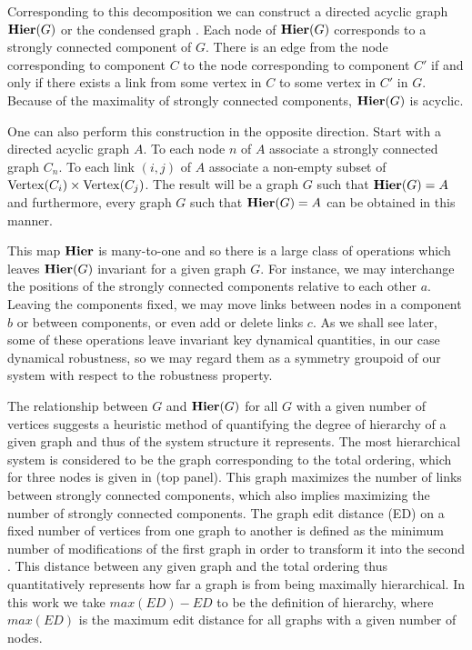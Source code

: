 Corresponding to this decomposition we can construct a directed acyclic graph $\mathbf{Hier} (G)$ or the condensed graph \cite{Corominas-Murtra2013}.  Each node of $\mathbf{Hier} (G)$ corresponds to a strongly connected component of $G$. There is an edge from the node corresponding to component $C$ to the node corresponding to component $C'$ if and only if there exists a link from some vertex in $C$ to some vertex in $C'$ in $G$.  Because of the maximality of strongly connected components, $\mathbf{Hier} (G)$ is acyclic.

One can also perform this construction in the opposite direction.  Start with a directed acyclic graph $A$.  To each node $n$ of $A$ associate
a strongly connected graph $C_n$.  To each link $(i,j)$ of $A$ associate a non-empty subset of $\mathrm{Vertex}(C_i) \times \mathrm{Vertex}(C_j)$.  The result will be a graph $G$ such that $\mathbf{Hier}(G) = A$ and furthermore, every graph $G$ such that $\mathbf{Hier}(G) = A$ can be obtained in this manner.

This map $\mathbf{Hier}$ is many-to-one and so there is a large class of
operations which leaves $\mathbf{Hier}(G)$ invariant for a given graph $G$.
For instance, we may interchange the positions of the strongly
connected components relative to each other $a$.  Leaving the components fixed, we may move links between nodes in a component $b$ or between components, or even add or delete links $c$.  As we shall see later, some of these operations leave invariant key dynamical quantities, in our case dynamical robustness, so we may regard them as a symmetry groupoid of our system with respect to the robustness property.

The relationship between $G$ and $\mathbf{Hier}(G)$ for all $G$ with a given number of vertices suggests a heuristic method of quantifying the degree of hierarchy of a given graph and thus of the system structure it represents. The most hierarchical system is considered to be the graph corresponding to the total ordering, which for three nodes is given in  (top panel). This graph maximizes the number of links between strongly connected components, which also implies maximizing the number of strongly connected components. The graph edit distance (ED) on a fixed number of vertices from one graph to another is defined as the minimum number of modifications of the first graph in order to transform it into the second \cite{Axenovich2011}. This distance between any given graph and the total ordering thus quantitatively represents how far a graph is from being maximally hierarchical. In this work we take $max(ED) - ED$ to be the definition of hierarchy, where $max(ED)$ is the maximum edit distance for all graphs with a given number of nodes.

